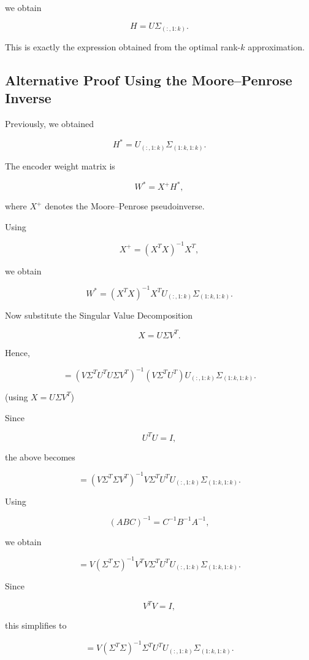 \documentclass{article}
\begin{document}
we obtain

\[
\boxed{
	H
	=
	U\Sigma_{(:,1:k)}.
}
\]

This is exactly the expression obtained from the optimal rank-$k$
approximation.

\subsection{Alternative Proof Using the Moore--Penrose Inverse}

Previously, we obtained

\[
H^{*}=U_{(:,1:k)}\Sigma_{(1:k,1:k)}.
\]

The encoder weight matrix is

\[
W^{*}=X^{+}H^{*},
\]

where \(X^{+}\) denotes the Moore--Penrose pseudoinverse.

Using

\[
X^{+}
=
(X^{T}X)^{-1}X^{T},
\]

we obtain

\[
W^{*}
=
(X^{T}X)^{-1}
X^{T}
U_{(:,1:k)}
\Sigma_{(1:k,1:k)}.
\]

Now substitute the Singular Value Decomposition

\[
X=U\Sigma V^{T}.
\]

Hence,

\[
=
\left(
V\Sigma^{T}U^{T}
U\Sigma V^{T}
\right)^{-1}
\left(
V\Sigma^{T}U^{T}
\right)
U_{(:,1:k)}
\Sigma_{(1:k,1:k)}.
\]

\hfill (using \(X=U\Sigma V^{T}\))

Since

\[
U^{T}U=I,
\]

the above becomes

\[
=
\left(
V\Sigma^{T}\Sigma V^{T}
\right)^{-1}
V\Sigma^{T}
U^{T}
U_{(:,1:k)}
\Sigma_{(1:k,1:k)}.
\]

Using

\[
(ABC)^{-1}
=
C^{-1}B^{-1}A^{-1},
\]

we obtain

\[
=
V
(\Sigma^{T}\Sigma)^{-1}
V^{T}
V
\Sigma^{T}
U^{T}
U_{(:,1:k)}
\Sigma_{(1:k,1:k)}.
\]

Since

\[
V^{T}V=I,
\]

this simplifies to

\[
=
V
(\Sigma^{T}\Sigma)^{-1}
\Sigma^{T}
U^{T}
U_{(:,1:k)}
\Sigma_{(1:k,1:k)}.
\]
\end{document}
